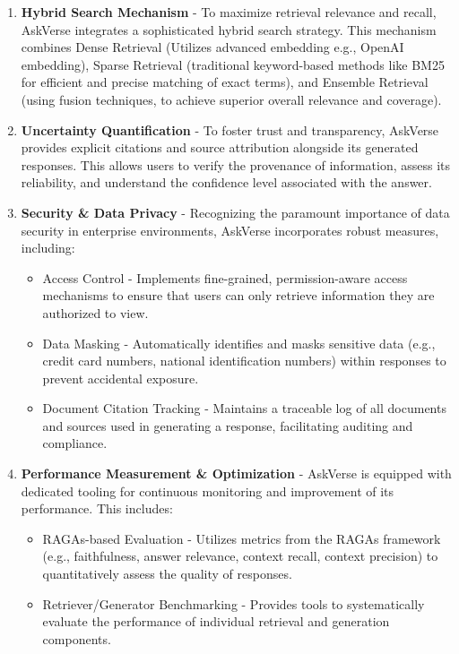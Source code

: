 \documentclass[default]{sn-jnl}%
\begin{document}
\begin{enumerate}
    This orchestration ensures that information is retrieved from the most relevant and authoritative sources, regardless of format or location.
    \item \textbf{Hybrid Search Mechanism} - To maximize retrieval relevance and recall, AskVerse integrates a sophisticated hybrid search strategy. This mechanism combines Dense Retrieval (Utilizes advanced embedding e.g., OpenAI embedding), Sparse Retrieval (traditional keyword-based methods like BM25 for efficient and precise matching of exact terms), and Ensemble Retrieval (using fusion techniques, to achieve superior overall relevance and coverage).
    \item \textbf{Uncertainty Quantification} - To foster trust and transparency, AskVerse provides explicit citations and source attribution alongside its generated responses. This allows users to verify the provenance of information, assess its reliability, and understand the confidence level associated with the answer.
    \item \textbf{Security \& Data Privacy} - Recognizing the paramount importance of data security in enterprise environments, AskVerse incorporates robust measures, including:
    \begin{itemize}
        \item Access Control - Implements fine-grained, permission-aware access mechanisms to ensure that users can only retrieve information they are authorized to view.
        \item Data Masking - Automatically identifies and masks sensitive data (e.g., credit card numbers, national identification numbers) within responses to prevent accidental exposure.
        \item Document Citation Tracking - Maintains a traceable log of all documents and sources used in generating a response, facilitating auditing and compliance.
    \end{itemize}
    \item \textbf{Performance Measurement \& Optimization} - AskVerse is equipped with dedicated tooling for continuous monitoring and improvement of its performance. This includes:
    \begin{itemize}
        \item RAGAs-based Evaluation - Utilizes metrics from the RAGAs framework (e.g., faithfulness, answer relevance, context recall, context precision) to quantitatively assess the quality of responses.
        \item Retriever/Generator Benchmarking - Provides tools to systematically evaluate the performance of individual retrieval and generation components.
    \end{itemize}
\end{enumerate}
\end{document}
